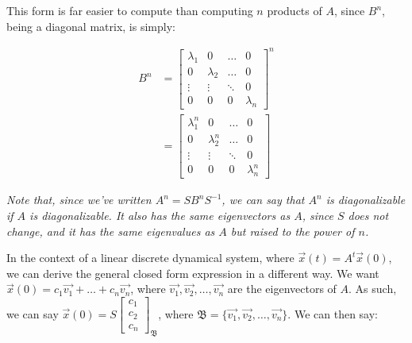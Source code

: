 \documentclass[12pt]{article}
\begin{document}
{This form is far easier to compute than computing $n$ products of $A$, since $B^n$, being a diagonal matrix, is simply:

\begin{align*}
    B^n &= \begin{bmatrix}
        \lambda_1 & 0 & \dots & 0\\
        0 & \lambda_2 & \dots & 0\\
        \vdots & \vdots & \ddots & 0 \\
        0 & 0 & 0 & \lambda_n
    \end{bmatrix}^n\\
    &= \begin{bmatrix}
        \lambda_1^n & 0 & \dots & 0\\
        0 & \lambda_2^n & \dots & 0\\
        \vdots & \vdots & \ddots & 0 \\
        0 & 0 & 0 & \lambda_n^n
    \end{bmatrix}
\end{align*}

\textit{Note that, since we've written $A^n = SB^nS^{-1}$, we can say that $A^n$ is diagonalizable if $A$ is diagonalizable. It also has the same eigenvectors as $A$, since $S$ does not change, and it has the same eigenvalues as $A$ but raised to the power of $n$.}

In the context of a linear discrete dynamical system, where $\vec{x}(t) = A^t\vec{x}(0)$, we can derive the general closed form expression in a different way. We want $\vec{x}(0) = c_1\vec{v_1} + \dots + c_n\vec{v_n}$, where $\vec{v_1}, \vec{v_2}, \dots, \vec{v_n}$ are the eigenvectors of $A$. As such, we can say $\vec{x}(0) = S\begin{bmatrix}
    c_1\\
    c_2\\
    c_n
\end{bmatrix}_{\mathfrak{B}}$, where $\mathfrak{B} = \{\vec{v_1}, \vec{v_2}, \dots, \vec{v_n}\}$. We can then say:

}
\end{document}
